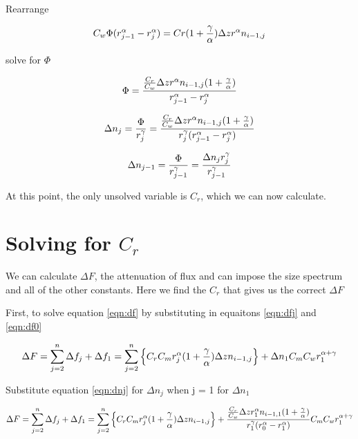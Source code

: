 \documentclass[a4paper,12pt]{article}
\begin{document}
Rearrange

\begin{equation}
C_w\Phi(r_{j-1}^\alpha - r_j^\alpha) = Cr(1 + {\gamma \over \alpha}) \Delta z r^{\alpha} n_{i-1,j}
\end{equation}

solve for $\Phi$

\begin{equation}
\Phi = {{{C_r \over C_w} \Delta z r^{\alpha} n_{i-1,j}(1 + {\gamma \over \alpha})} \over {r_{j-1}^\alpha - r_j^\alpha}}
\end{equation}

\begin{equation}
\Delta n_j = {\Phi \over r_j^\gamma} = {{{C_r \over C_w} \Delta z r^{\alpha} n_{i-1,j}(1 + {\gamma \over \alpha})} \over {r_j^\gamma(r_{j-1}^\alpha - r_j^\alpha})}
\label{eqn:dnj}
\end{equation}

\begin{equation}
\Delta n_{j-1} = {\Phi \over r_{j-1}^\gamma} = {{\Delta n_j r_j^\gamma} \over {r_{j-1}^\gamma}}
\end{equation}

At this point, the only unsolved variable is $C_r$, which we can now calculate.


\section{Solving for $C_r$}

We can calculate $\Delta F $, the attenuation of flux and can impose the size spectrum and all of the other constants. Here we find the $C_r$ that gives us the correct $\Delta F $

First, to solve equation \ref{eqn:df} by substituting in equaitons \ref{eqn:dfj} and \ref{eqn:df0}

\begin{equation}
\Delta F = \sum_{j = 2}^n \Delta f_j + \Delta f_1 = 
\sum_{j = 2}^n \left\{C_r C_m r_j^\alpha(1+{\gamma \over \alpha}) \Delta z n_{i-1,j} \right\} +
\Delta n_1 C_m C_w r_1^{\alpha + \gamma}
\end{equation}

Substitute equation \ref{eqn:dnj} for $\Delta n_j$ when j = 1 for $\Delta n_1$

\begin{equation}
\Delta F = \sum_{j = 2}^n \Delta f_j + \Delta f_1 = 
\sum_{j = 2}^n \left\{C_r C_m r_j^\alpha(1+{\gamma \over \alpha}) \Delta z n_{i-1,j} \right\} +
 {{{C_r \over C_w} \Delta z r_1^{\alpha} n_{i-1,1}(1 + {\gamma \over \alpha})} \over {r_1^{\gamma}(r_{0}^\alpha - r_1^\alpha})}
C_m C_w r_1^{\alpha + \gamma}
\end{equation}
\end{document}
